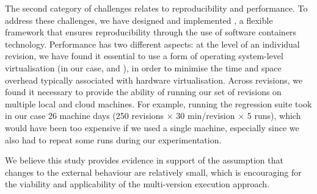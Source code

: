 The second category of challenges relates to reproducibility and
performance. To address these challenges, we have designed and
implemented \covrig, a flexible framework that ensures reproducibility
through the use of software containers technology.  Performance has
two different aspects: at the level of an individual revision, we have
found it essential to use a form of operating system-level
virtualisation (in our case, \lxc and \docker), in order to minimise
the time and space overhead typically associated with hardware
virtualisation.  Across revisions, we found it necessary to provide
the ability of running our set of revisions on multiple local and
cloud machines.  For example, running the \git regression suite took
in our case 26 machine days (250 revisions $\times$ 30 min/revision
$\times$ 5 runs), which would have been too expensive if we used a
single machine, especially since we also had to repeat some runs
during our experimentation.

We believe this study provides evidence in support of the assumption that
changes to the external behaviour are relatively small, which is encouraging
for the viability and applicability of the multi-version execution approach.
